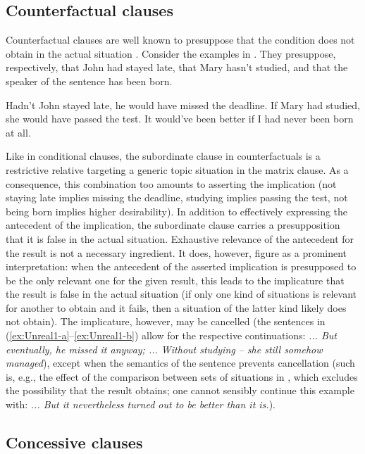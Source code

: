 \documentclass[output=paper]{langscibook}
\begin{document}
\subsection{Counterfactual clauses}

Counterfactual clauses are well known to presuppose that the condition does not obtain in the actual situation \citep{Lewis:1973}. Consider the examples in . They presuppose, respectively, that John had stayed late, that Mary hasn't studied, and that the speaker of the sentence has been born.

\ea\label{ex:Unreal1}
\ea Hadn't John stayed late, he would have missed the deadline.\label{ex:Unreal1-a}
\ex If Mary had studied, she would have passed the test.\label{ex:Unreal1-b}
\ex It would've been better if I had never been born at all.\label{ex:Unreal1-c}
\z\z

\noindent Like in conditional clauses, the subordinate clause in counterfactuals is a restrictive relative targeting a generic topic situation in the matrix clause. As a consequence, this combination too amounts to asserting the implication (not staying late implies missing the deadline, studying implies passing the test, not being born implies higher desirability). In addition to effectively expressing the antecedent of the implication, the subordinate clause carries a presupposition that it is false in the actual situation. Exhaustive relevance of the antecedent for the result is not a necessary ingredient. It does, however, figure as a prominent interpretation: when the antecedent of the asserted implication is presupposed to be the only relevant one for the given result, this leads to the implicature that the result is false in the actual situation (if only one kind of situations is relevant for another to obtain and it fails, then a situation of the latter kind likely does not obtain). The implicature, however, may be cancelled (the sentences in (\ref{ex:Unreal1-a}--\ref{ex:Unreal1-b}) allow for the respective continuations: \textit{... But eventually, he missed it anyway; ... Without studying -- she still somehow managed}), except when the semantics of the sentence prevents cancellation (such is, e.g., the effect of the comparison between sets of situations in , which excludes the possibility that the result obtains; one cannot sensibly continue this example with: \textit{... But it nevertheless turned out to be better than it is.}).

\subsection{Concessive clauses}\largerpage
\end{document}
